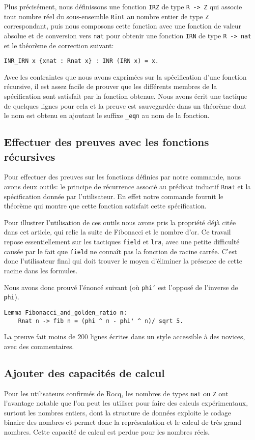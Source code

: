 \documentclass{modjflart}
\begin{document}
Plus précisément, nous définissons une fonction \texttt{IRZ} de type
\texttt{R -> Z} qui associe tout nombre réel du sous-ensemble \texttt{Rint}
au nombre entier de type \texttt{Z} correspondant, puis nous composons
cette fonction avec une fonction de valeur absolue et de conversion
vers \texttt{nat} pour obtenir une fonction \texttt{IRN} de type \texttt{R ->
  nat} et le théorème de correction suivant:
\begin{verbatim}
INR_IRN x {xnat : Rnat x} : INR (IRN x) = x.
\end{verbatim}

Avec les contraintes que nous avons exprimées sur la spécification
d'une fonction récursive, il est assez facile de prouver que les
différents membres de la spécification sont satisfait par la fonction
obtenue.  Nous avons écrit une tactique de quelques lignes pour cela
et la preuve est sauvegardée dans un théorème dont le nom est obtenu
en ajoutant le suffixe \texttt{\_eqn} au nom de la fonction.

\subsection{Effectuer des preuves avec les fonctions récursives}
Pour effectuer des preuves sur les fonctions définies par notre
commande, nous avons deux outils: le principe de récurrence associé au
prédicat inductif \texttt{Rnat} et la spécification donnée par
l'utilisateur.  En effet notre commande fournit le théorème qui montre
que cette fonction satisfait cette spécification.

Pour illustrer l'utilisation de ces outils nous avons pris la
propriété déjà citée dans cet article, qui relie la suite de Fibonacci
et le nombre d'or.  Ce travail repose essentiellement sur les
tactiques \texttt{field} et \texttt{lra}, avec une petite difficulté causée
par le fait que \texttt{field} ne connaît pas la fonction de racine
carrée.  C'est donc l'utilisateur final qui doit trouver le moyen
d'éliminer la présence de cette racine dans les formules.

Nous avons donc prouvé l'énoncé suivant (où \texttt{phi'} est l'opposé
de l'inverse de \texttt{phi}).
\begin{verbatim}
Lemma Fibonacci_and_golden_ratio n:
    Rnat n -> fib n = (phi ^ n - phi' ^ n)/ sqrt 5.
\end{verbatim}
La preuve fait moins de 200 lignes écrites dans un style accessible à
des novices, avec des commentaires.
\subsection{Ajouter des capacités de calcul}
Pour les utilisateurs confirmés de Rocq, les nombres de types \texttt{nat} ou
\texttt{Z} ont l'avantage notable que l'on peut
les utiliser pour faire des calculs
expérimentaux, surtout les nombres entiers, dont la structure de données
exploite le codage binaire des nombres et permet donc la représentation
et le calcul de très grand nombres.  Cette capacité de calcul est perdue pour
les nombres réels.
\end{document}

